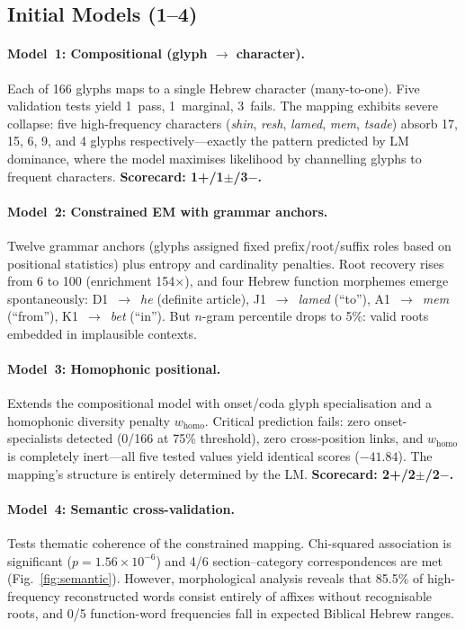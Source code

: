 \subsection{Initial Models (1--4)}

\paragraph{Model~1: Compositional (glyph $\to$ character).}
Each of 166 glyphs maps to a single Hebrew character (many-to-one).  Five validation tests yield 1~pass, 1~marginal, 3~fails.  The mapping exhibits severe collapse: five high-frequency characters (\textit{shin}, \textit{resh}, \textit{lamed}, \textit{mem}, \textit{tsade}) absorb 17, 15, 6, 9, and 4 glyphs respectively---exactly the pattern predicted by LM dominance, where the model maximises likelihood by channelling glyphs to frequent characters.  \textbf{Scorecard: 1+/1$\pm$/3$-$.}

\paragraph{Model~2: Constrained EM with grammar anchors.}
Twelve grammar anchors (glyphs assigned fixed prefix/root/suffix roles based on positional statistics) plus entropy and cardinality penalties.  Root recovery rises from 6 to 100 (enrichment 154$\times$), and four Hebrew function morphemes emerge spontaneously: D1~$\to$~\textit{he} (definite article), J1~$\to$~\textit{lamed} (``to''), A1~$\to$~\textit{mem} (``from''), K1~$\to$~\textit{bet} (``in'').  But $n$-gram percentile drops to 5\%: valid roots embedded in implausible contexts.

\paragraph{Model~3: Homophonic positional.}
Extends the compositional model with onset/coda glyph specialisation and a homophonic diversity penalty $w_{\text{homo}}$.  Critical prediction fails: zero onset-specialists detected (0/166 at 75\% threshold), zero cross-position links, and $w_{\text{homo}}$ is completely inert---all five tested values yield identical scores ($-41.84$).  The mapping's structure is entirely determined by the LM.  \textbf{Scorecard: 2+/2$\pm$/2$-$.}

\paragraph{Model~4: Semantic cross-validation.}
Tests thematic coherence of the constrained mapping.  Chi-squared association is significant ($p = 1.56 \times 10^{-6}$) and 4/6 section--category correspondences are met (Fig.~\ref{fig:semantic}).  However, morphological analysis reveals that 85.5\% of high-frequency reconstructed words consist entirely of affixes without recognisable roots, and 0/5 function-word frequencies fall in expected Biblical Hebrew ranges.

